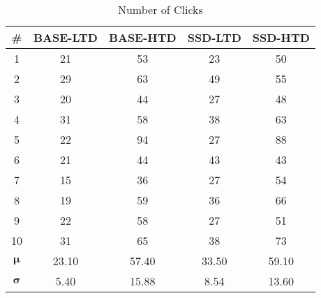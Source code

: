 \begin{table}[H]
\centering\footnotesize
\caption{Number of Clicks}
\label{tab:DATA_AC_CLICKS}
\begin{tabular}{ccccc}
\textbf{\#} & \textbf{BASE-LTD} & \textbf{BASE-HTD} & \textbf{SSD-LTD} & \textbf{SSD-HTD} \\\hline
1 & 21 & 53 & 23 & 50 \\
2 & 29 & 63 & 49 & 55 \\
3 & 20 & 44 & 27 & 48 \\
4 & 31 & 58 & 38 & 63 \\
5 & 22 & 94 & 27 & 88 \\
6 & 21 & 44 & 43 & 43 \\
7 & 15 & 36 & 27 & 54 \\
8 & 19 & 59 & 36 & 66 \\
9 & 22 & 58 & 27 & 51 \\
10 & 31 & 65 & 38 & 73 \\\hline
$\mathbf{\mu}$ & 23.10 & 57.40 & 33.50 & 59.10 \\
$\mathbf{\sigma}$ & 5.40 & 15.88 & 8.54 & 13.60 \\
\end{tabular}
\end{table}
